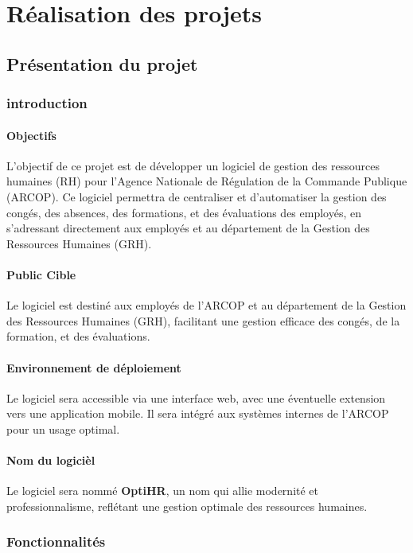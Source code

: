 \chapter{Réalisation des projets}
\clearpage
\section{Présentation du projet}
\subsection{introduction}
\subsubsection{Objectifs}
L'objectif de ce projet est de développer un logiciel de gestion des ressources humaines (RH) pour l'Agence Nationale de Régulation de la Commande Publique (ARCOP). Ce logiciel permettra de centraliser et d'automatiser la gestion des congés, des absences, des formations, et des évaluations des employés, en s'adressant directement aux employés et au département de la Gestion des Ressources Humaines (GRH).
\subsubsection{Public Cible}
Le logiciel est destiné aux employés de l’ARCOP et au département de la Gestion des Ressources Humaines (GRH), facilitant une gestion efficace des congés, de la formation, et des évaluations.

\subsubsection{Environnement de déploiement}
Le logiciel sera accessible via une interface web, avec une éventuelle extension vers une application mobile. Il sera intégré aux systèmes internes de l’ARCOP pour un usage optimal.

\subsubsection{Nom du logicièl}
Le logiciel sera nommé \textbf{OptiHR}, un nom qui allie modernité et professionnalisme, reflétant une gestion
optimale des ressources humaines.
\subsection{Fonctionnalités}


